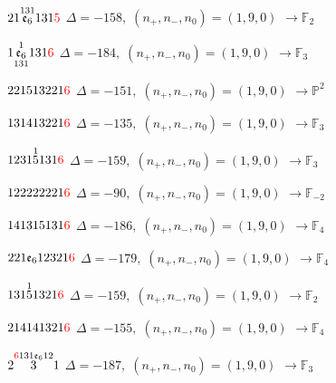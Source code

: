 \documentclass[10pt]{article}
\begin{document}
$21\overset{131}{\mathfrak{e}_6}131\textcolor{red}{5}$ \quad $\Delta=-158,\; (n_+,n_-,n_0)=(1,9,0)$ \quad $\to \mathbb{F}_{2}$

\smallskip

$1\overset{1}{\underset{131}{\mathfrak{e}_6}}131\textcolor{red}{6}$ \quad $\Delta=-184,\; (n_+,n_-,n_0)=(1,9,0)$ \quad $\to \mathbb{F}_{3}$

\smallskip

$221513221\textcolor{red}{6}$ \quad $\Delta=-151,\; (n_+,n_-,n_0)=(1,9,0)$ \quad $\to \mathbb{P}^2$

\smallskip

$131413221\textcolor{red}{6}$ \quad $\Delta=-135,\; (n_+,n_-,n_0)=(1,9,0)$ \quad $\to \mathbb{F}_{3}$

\smallskip

$1231\overset{1}{5}131\textcolor{red}{6}$ \quad $\Delta=-159,\; (n_+,n_-,n_0)=(1,9,0)$ \quad $\to \mathbb{F}_{3}$

\smallskip

$122222221\textcolor{red}{6}$ \quad $\Delta=-90,\; (n_+,n_-,n_0)=(1,9,0)$ \quad $\to \mathbb{F}_{-2}$

\smallskip

$141315131\textcolor{red}{6}$ \quad $\Delta=-186,\; (n_+,n_-,n_0)=(1,9,0)$ \quad $\to \mathbb{F}_{4}$

\smallskip

$221\mathfrak{e}_612321\textcolor{red}{6}$ \quad $\Delta=-179,\; (n_+,n_-,n_0)=(1,9,0)$ \quad $\to \mathbb{F}_{4}$

\smallskip

$131\overset{1}{5}1321\textcolor{red}{6}$ \quad $\Delta=-159,\; (n_+,n_-,n_0)=(1,9,0)$ \quad $\to \mathbb{F}_{2}$

\smallskip

$214141321\textcolor{red}{6}$ \quad $\Delta=-155,\; (n_+,n_-,n_0)=(1,9,0)$ \quad $\to \mathbb{F}_{4}$

\smallskip

$2\overset{\textcolor{red}{6}131\mathfrak{e}_612}{3}1$ \quad $\Delta=-187,\; (n_+,n_-,n_0)=(1,9,0)$ \quad $\to \mathbb{F}_{3}$
\end{document}
